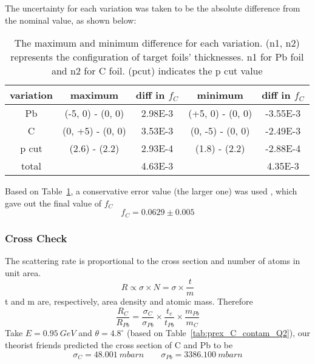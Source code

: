 The uncertainty for each variation was taken to be the absolute difference 
from the nominal value, as shown below:
\begin{table}
    \centering
    \begin{tabular}{c | c c | c c}
	\hline
	variation   & maximum	& diff in $f_C$  & minimum    & diff in $f_C$ \\
	\hline
	Pb & (-5, 0) - (0, 0)	& 2.98E-3   & (+5, 0) - (0, 0)	& -3.55E-3  \\
	C  & (0, +5) - (0, 0)	& 3.53E-3   & (0, -5) - (0, 0)	& -2.49E-3  \\
	p cut	& (2.6) - (2.2)	& 2.93E-4   & (1.8) - (2.2)	& -2.88E-4  \\
	\hline
	total	&   & 4.63E-3	&   & 4.35E-3	\\
	\hline
    \end{tabular}
    \caption{The maximum and minimum difference for each variation. (n1, n2) 
    represents the configuration of target foils' thicknesses. n1 for Pb foil
    and n2 for C foil. (pcut) indicates the p cut value}
    \label{tab:prex_C_contam_error}
\end{table}
Based on Table~\ref{tab:prex_C_contam_error}, a conservative error value 
(the larger one) was used , which gave out the final value of $f_C$
\begin{equation*}
    f_C = 0.0629 \pm 0.005
\end{equation*}

\subsubsection{Cross Check}
The scattering rate is proportional to the cross section and number of atoms
in unit area. 
\begin{equation}
    R \propto \sigma \times N = \sigma \times \frac{t}{m}
\end{equation}
t and m are, respectively, area density and atomic mass. Therefore
\begin{equation}
    \frac{R_C}{R_{Pb}} = \frac{\sigma_C}{\sigma_{Pb}} \times \frac{t_c}{t_{Pb}} \times \frac{m_{Pb}}{m_C}
\end{equation}
Take $E = 0.95\ GeV$ and $\theta = 4.8^\circ$ (based on Table~\ref{tab:prex_C_contam_Q2}), 
our theorist friends predicted the cross section of C and Pb to be
\begin{equation*}
    \sigma_C = 48.001\ mbarn	\qquad \sigma_{Pb} = 3386.100\ mbarn	
\end{equation*}

